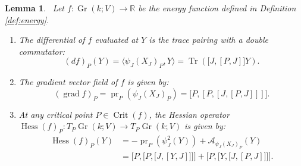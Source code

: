 \documentclass[12pt, final]{article}
\def\R{\mathbb{R}}
\def\A{\mathcal{A}}
\def\pr{\operatorname{pr}}
\def\Crit{\operatorname{Crit}}
\def\grad{\operatorname{grad}}
\def\Hess{\operatorname{Hess}}
\def\Gr{\operatorname{Gr}}
\def\Tr{\operatorname{Tr}}
\newtheorem{lemma}[theorem]{Lemma}
\begin{document}
\begin{lemma}\label{lem:derivatives} \
Let $f: \Gr(k; V) \to \R$ be the energy function defined in Definition \ref{def:energy}.
\begin{enumerate}
    \item The differential of $f$ evaluated at $Y$ is the trace pairing with a double commutator:
    \[ (df)_P(Y) = \langle \psi_J(X_J)_P, Y\rangle =   \Tr\left( \big[ J, [P, J]\big] Y \right). \]
    \item The gradient vector field of $f$ is given by:
    \[ (\grad f)_P = \pr_P (\psi_J(X_J)_P) = \big[ P, [P, [J, [P, J]]] \big]. \]
    \item At any critical point $P \in \Crit(f)$, the Hessian operator $\Hess(f)_P:T_P\Gr(k; V) 
    \to T_P\Gr(k; V)$ is given by:
    \begin{align*}\Hess(f)_P(Y) &= -\pr_P (\psi_J^2(Y)) + \A_{\psi_J(X_J)_P}(Y) \\&= \bigg[P, \big[P, \big [J, [Y, J]\big]\big]\bigg] + \bigg[P, \big[Y, \big[J, [P, J]\big] \big] \bigg].\end{align*}
\end{enumerate}
\end{lemma}
\end{document}
